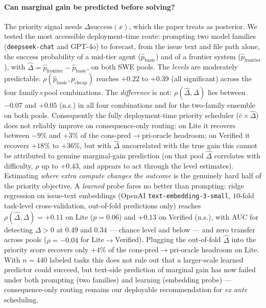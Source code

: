 \documentclass{article}
\begin{document}
\paragraph{Can marginal gain be predicted before solving?} The
priority signal needs $\Delta\mathrm{success}(x)$, which the paper
treats as posterior. We tested the most accessible deployment-time
route: prompting two model families (\texttt{deepseek-chat} and
GPT-4o) to forecast, from the issue text and file path alone, the
success probability of a mid-tier agent ($\hat{p}_{\mathrm{basic}}$)
and of a frontier system ($\hat{p}_{\mathrm{frontier}}$), with
$\hat{\Delta} = \hat{p}_{\mathrm{frontier}} -
\hat{p}_{\mathrm{basic}}$, on both SWE pools. The \emph{levels} are
moderately predictable: $\rho(\hat{p}_{\mathrm{basic}},
p_{\mathrm{cheap}})$ reaches $+0.22$ to $+0.39$ (all significant)
across the four family$\times$pool combinations. The
\emph{difference} is not: $\rho(\hat{\Delta}, \Delta)$ lies between
$-0.07$ and $+0.05$ (n.s.) in all four combinations and for the
two-family ensemble on both pools. Consequently the fully
deployment-time priority scheduler
($\hat{c} \times \hat{\Delta}$) does not reliably improve on
consequence-only routing: on Lite it recovers between $-9\%$ and
$+3\%$ of the cons-pred$\to$pri-oracle headroom; on Verified it
recovers $+18\%$ to $+36\%$, but with $\hat{\Delta}$ uncorrelated
with the true gain this cannot be attributed to genuine marginal-gain
prediction (on that pool $\hat{\Delta}$ correlates with difficulty,
$\rho$ up to $+0.43$, and appears to act through the level
estimates). Estimating \emph{where extra compute changes the
outcome} is the genuinely hard half of the priority objective.
A \emph{learned} probe fares no better than prompting: ridge
regression on issue-text embeddings (OpenAI
\texttt{text-embedding-3-small}, $10$-fold task-level
cross-validation, out-of-fold predictions only) reaches
$\rho(\hat{\Delta}, \Delta) = +0.11$ on Lite ($p = 0.06$) and
$+0.13$ on Verified (n.s.), with AUC for detecting $\Delta > 0$ at
$0.49$ and $0.34$ --- chance level and below --- and zero transfer
across pools ($\rho = -0.04$ for Lite$\to$Verified). Plugging the
out-of-fold $\hat{\Delta}$ into the priority score recovers only
$+4\%$ of the cons-pred$\to$pri-oracle headroom on Lite. With
$n = 440$ labeled tasks this does not rule out that a larger-scale
learned predictor could succeed, but text-side prediction of
marginal gain has now failed under both prompting (two families) and
learning (embedding probe) --- consequence-only routing remains our
deployable recommendation for \emph{ex ante} scheduling.
\end{document}
